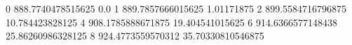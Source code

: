 0 888.7740478515625 0.0
1 889.7857666015625 1.01171875
2 899.5584716796875 10.784423828125
4 908.1785888671875 19.404541015625
6 914.6366577148438 25.86260986328125
8 924.4773559570312 35.70330810546875
